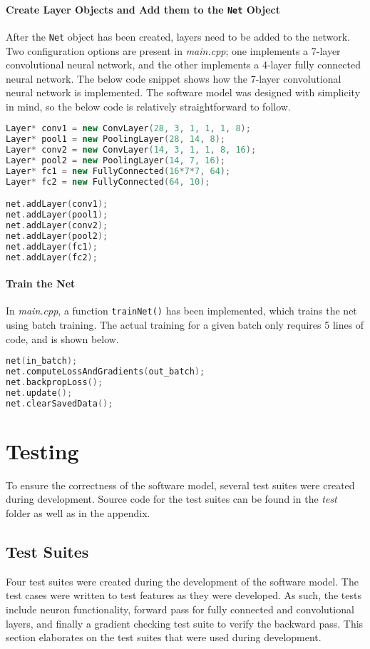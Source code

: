 \paragraph{Create Layer Objects and Add them to the \texttt{Net} Object} 
After the \texttt{Net} object has been created, layers need to be added to the network. Two configuration options are present in \textit{main.cpp}; one implements a 7-layer convolutional neural network, and the other implements a 4-layer fully connected neural network. The below code snippet shows how the 7-layer convolutional neural network is implemented. The software model was designed with simplicity in mind, so the below code is relatively straightforward to follow.
\begin{lstlisting}[language=c++]
Layer* conv1 = new ConvLayer(28, 3, 1, 1, 1, 8);
Layer* pool1 = new PoolingLayer(28, 14, 8);
Layer* conv2 = new ConvLayer(14, 3, 1, 1, 8, 16);
Layer* pool2 = new PoolingLayer(14, 7, 16);
Layer* fc1 = new FullyConnected(16*7*7, 64);
Layer* fc2 = new FullyConnected(64, 10);

net.addLayer(conv1);
net.addLayer(pool1);
net.addLayer(conv2);
net.addLayer(pool2);
net.addLayer(fc1);
net.addLayer(fc2);
\end{lstlisting}

\paragraph{Train the Net}
In \textit{main.cpp}, a function \texttt{trainNet()} has been implemented, which trains the net using batch training. The actual training for a given batch only requires 5 lines of code, and is shown below.
\begin{lstlisting}[language=c++]
net(in_batch);
net.computeLossAndGradients(out_batch);
net.backpropLoss();
net.update();
net.clearSavedData();
\end{lstlisting}


\section{Testing}
To ensure the correctness of the software model, several test suites were created during development. Source code for the test suites can be found in the \textit{test} folder as well as in the appendix.
\subsection{Test Suites}
Four test suites were created during the development of the software model. The test cases were written to test features as they were developed. As such, the tests include neuron functionality, forward pass for fully connected and convolutional layers, and finally a gradient checking test suite to verify the backward pass. This section elaborates on the test suites that were used during development.

